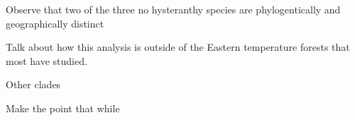 \documentclass{article}\usepackage[]{graphicx}\usepackage[]{color}
\begin{document}
Observe that two of the three no hysteranthy species are phylogentically and geographically distinct

Talk about how this analysis is outside of the Eastern temperature forests that most have studied. 

Other clades

Make the point that while


\end{document}
